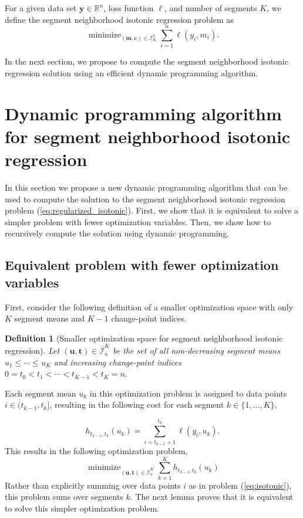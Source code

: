 \documentclass{article}
\newtheorem{definition}{Definition}
\DeclareMathOperator*{\minimize}{minimize}
\newcommand{\RR}{\mathbb R}
\begin{document}
For a given data set $\mathbf y\in\RR^n$, loss function $\ell$, and
number of segments $K$, we define the segment neighborhood isotonic regression
problem as
\begin{equation}
  \label{eq:regularized_isotonic}
  \minimize_{(\mathbf m, \mathbf c)\in\mathcal I_K^n} \sum_{i=1}^n \ell(y_i, m_i).
\end{equation}

In the next section, we propose to compute the segment neighborhood isotonic regression solution
using an efficient dynamic programming algorithm.

\newcommand{\FCC}{\widetilde{C}}
\newcommand{\M}{\mathcal{M}}
\section{Dynamic programming algorithm for segment neighborhood isotonic regression}

In this section we propose a new dynamic programming algorithm that
can be used to compute the solution to the segment neighborhood isotonic
regression problem (\ref{eq:regularized_isotonic}). First, we show
that it is equivalent to solve a simpler problem with fewer
optimization variables. Then, we show how to recursively compute the
solution using dynamic programming.


\subsection{Equivalent problem with fewer optimization 
variables}

First, consider the following definition of a smaller optimization
space with only $K$ segment means and $K-1$ change-point indices.

\begin{definition}[Smaller optimization space for segment neighborhood isotonic regression]
\label{def:Ibar}
  Let $(\mathbf u, \mathbf t)\in\bar{\mathcal I}_n^K$ be the set of
  all non-decreasing segment means $u_1\leq\cdots\leq u_K$ and
  increasing change-point indices $0=t_0<t_1<\cdots<t_{K-1}<t_K=n$.
\end{definition}

Each segment mean $u_k$ in this optimization problem is assigned to
data points $i\in(t_{k-1},t_k]$, resulting in the following cost
for each segment $k\in\{1, \dots, K\}$,

\begin{equation}
  \label{eq:h}
  h_{t_{k-1}, t_k}(u_k) = \sum_{i=t_{k-1}+1}^{t_k} \ell(y_i, u_k).
\end{equation}
This results in the following optimization problem,
\begin{equation}
  \label{eq:isotonic_ut}
  \minimize_{(\mathbf u, \mathbf t)\in\bar{\mathcal I}_n^K}
  \sum_{k=1}^K
  h_{t_{k-1}, t_k}(u_k)
\end{equation}
Rather than explicitly summing over data points $i$ as in problem
(\ref{eq:isotonic}), this problem sums over segments $k$. The next lemma
proves that it is equivalent to solve this simpler optimization problem.
\end{document}
